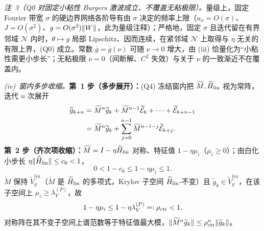\documentclass[fontset=windows,11pt]{ctexart}
\DeclarePairedDelimiter{\norm}{\lVert}{\rVert}
\newcommand{\W}{W}
\newcommand{\Erem}{\mathcal E}
\newcommand{\wt}[1]{\widetilde{#1}}
\numberwithin{equation}{section}
\begin{document}
\noindent\emph{注~3（Q0 对固定小粘性 Burgers 激波成立、不覆盖无粘极限）。}量级上，固定 Fourier 带宽 $\sigma$ 的硬边界网络各阶导有由 $\sigma$ 决定的频率上限（$u_x=O(\sigma)$、$J=O(\sigma^2)$、$g=O(\sigma^3)\norm\W$，此为量级注释）；严格地，固定 $\sigma$ 且迭代留在有界邻域 $\mathcal N$ 内时，$\theta\mapsto g$ 局部 Lipschitz、因而连续，在紧邻域 $\mathcal N$ 上取得与 $\eta$ 无关的有限上界，(Q0) 成立。常数 $\bar g=\bar g(\nu)$ 可随 $\nu\to0$ 增大，由 (iii) 恰量化为“小粘性需更小步长”；无粘极限 $\nu=0$（间断解、$C^2$ 失效）与关于 $\nu$ 的一致渐近不在覆盖内。

\medskip
\emph{(iv)~窗内多步收缩。}\textbf{第~1 步（多步展开）：}(Q4) 冻结窗内把 $\wt M,\wt H_{\rm lin}$ 视为常阵，迭代 $n$ 次展开
\begin{align}
\wt g_{k+n}&=\wt M^n\wt g_k+\wt M^{n-1}\wt\Erem_k+\cdots+\wt\Erem_{k+n-1}\notag\\
&=\wt M^n\wt g_k+\sum_{j=0}^{n-1}\wt M^{n-1-j}\wt\Erem_{k+j}.
\end{align}
\textbf{第~2 步（齐次项收缩）：}$\wt M=I-\eta\wt H_{\rm lin}$ 对称、特征值 $1-\eta\mu_i$（$\mu_i\ge0$）；由白化小步长 $\eta\norm{\wt H_{\rm lin}}\le c_0<1$，
\begin{equation}
0<1-c_0\le1-\eta\mu_i\le1.
\end{equation}
$\wt M$ 保持 $\wt V_g^{lin}$（$\wt M$ 是 $\wt H_{\rm lin}$ 的多项式，Krylov 子空间 $\wt H_{\rm lin}$-不变）且 $\wt g_k\in\wt V_g^{lin}$，在该子空间上 $\mu_i\ge\lambda_V^{(P)}$，故
\begin{equation}
1-\eta\mu_i\le1-\eta\lambda_V^{(P)}=:\rho_{\rm ctr}<1,
\end{equation}
对称阵在其不变子空间上谱范数等于特征值最大模，$\norm{\wt M^n\wt g_k}\le\rho_{\rm ctr}^n\norm{\wt g_k}$。
\end{document}
